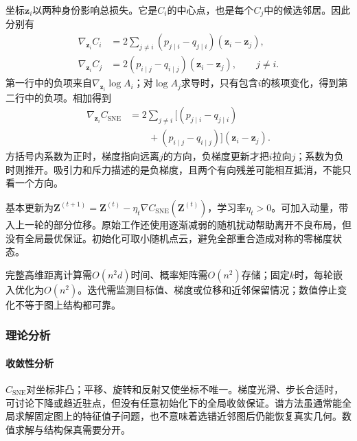 坐标$\bm{z}_i$以两种身份影响总损失。它是$C_i$的中心点，也是每个$C_j$中的候选邻居。因此分别有
\begin{equation}
  \label{eq:dim-sne-two-roles}
  \begin{aligned}
    \nabla_{\bm{z}_i}C_i
      &=2\sum_{j\ne i}(p_{j\mid i}-q_{j\mid i})
        (\bm{z}_i-\bm{z}_j),\\
    \nabla_{\bm{z}_i}C_j
      &=2(p_{i\mid j}-q_{i\mid j})
        (\bm{z}_i-\bm{z}_j),\qquad j\ne i.
  \end{aligned}
\end{equation}
第一行中的负项来自$\nabla_{\bm{z}_i}\log A_i$；对$\log A_j$求导时，只有包含$i$的核项变化，得到第二行中的负项。相加得到
\begin{equation}
  \label{eq:dim-sne-gradient}
  \begin{aligned}
    \nabla_{\bm{z}_i}C_{\mathrm{SNE}}
      &=2\sum_{j\ne i}
        \bigl[(p_{j\mid i}-q_{j\mid i})\\
      &\qquad +(p_{i\mid j}-q_{i\mid j})\bigr]
        (\bm{z}_i-\bm{z}_j).
  \end{aligned}
\end{equation}
方括号内系数为正时，梯度指向远离$j$的方向，负梯度更新才把$i$拉向$j$；系数为负时则推开。吸引力和斥力描述的是负梯度，且两个有向残差可能相互抵消，不能只看一个方向。

基本更新为$\bm{Z}^{(t+1)}=\bm{Z}^{(t)}-\eta_t\nabla C_{\mathrm{SNE}}(\bm{Z}^{(t)})$，学习率$\eta_t>0$。可加入动量，带入上一轮的部分位移。原始工作还使用逐渐减弱的随机扰动帮助离开不良布局，但没有全局最优保证。初始化可取小随机点云，避免全部重合造成对称的零梯度状态。

完整高维距离计算需$O(n^2d)$时间、概率矩阵需$O(n^2)$存储；固定$k$时，每轮嵌入优化为$O(n^2)$。迭代需监测目标值、梯度或位移和近邻保留情况；数值停止变化不等于图上结构都可靠。

\subsubsection{理论分析}
\label{sec:dim-sne-theory}

\paragraph{收敛性分析}

$C_{\mathrm{SNE}}$对坐标非凸；平移、旋转和反射又使坐标不唯一。梯度光滑、步长合适时，可讨论下降或趋近驻点，但没有任意初始化下的全局收敛保证。谱方法虽通常能全局求解固定图上的特征值子问题，也不意味着选错近邻图后仍能恢复真实几何。数值求解与结构保真需要分开。

